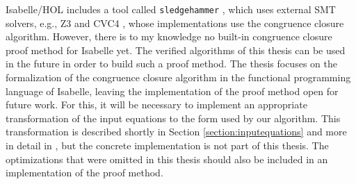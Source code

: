 Isabelle/HOL includes a tool called \lstinline|sledgehammer| \cite{sledgehammer}, which uses external SMT solvers, e.g., Z3 \cite{z3} and CVC4 \cite{cvc4}, whose implementations use the congruence closure algorithm.
However, there is to my knowledge no built-in congruence closure proof method for Isabelle yet.
The verified algorithms of this thesis can be used in the future in order to build such a proof method.
The thesis focuses on the formalization of the congruence closure algorithm in the functional programming language of Isabelle, leaving the implementation of the proof method open for future work.
For this, it will be necessary to implement an appropriate transformation of the input equations to the form used by our algorithm.
This transformation is described shortly in Section \ref{section:inputequations} and more in detail in \cite{Nieuwenhuis}, but the concrete implementation is not part of this thesis.
The optimizations that were omitted in this thesis should also be included in an implementation of the proof method.
